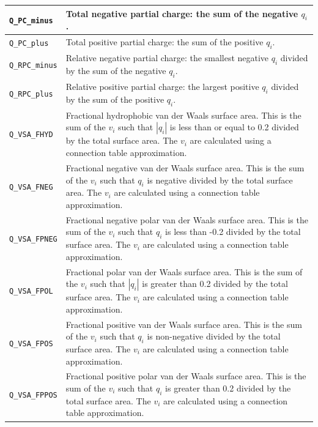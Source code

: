\documentclass[12pt,a4paper]{article}
\begin{document}
\begin{longtable}{@{\zz}|p{}|p{}|}
\texttt{Q\_PC\_minus} & Total negative partial charge: the sum of the 
negative $q_i$.\\ \hline

\texttt{Q\_PC\_plus} & Total positive partial charge: the sum of the 
positive $q_i$.\\ \hline

\texttt{Q\_RPC\_minus} & Relative negative partial charge: the smallest 
negative $q_i$ divided by the sum of the negative $q_i$.\\ \hline

\texttt{Q\_RPC\_plus} & Relative positive partial charge: the largest 
positive $q_i$ divided by the sum of the positive $q_i$.\\ \hline

\texttt{Q\_VSA\_FHYD} & Fractional hydrophobic van der Waals surface 
area. This is the sum of the $v_i$ such that $|q_i|$ is less than or 
equal to 0.2 divided by the total surface area. The $v_i$ are 
calculated using a connection table approximation.\\ \hline

\texttt{Q\_VSA\_FNEG} & Fractional negative van der Waals surface 
area. This is the sum of the $v_i$ such that $q_i$ is negative 
divided by the total surface area. The $v_i$ are calculated using 
a connection table approximation.\\ \hline

\texttt{Q\_VSA\_FPNEG} & Fractional negative polar van der Waals 
surface area. This is the sum of the $v_i$ such that $q_i$ is 
less than -0.2 divided by the total surface area. The $v_i$ are 
calculated using a connection table approximation.\\ \hline

\texttt{Q\_VSA\_FPOL} & Fractional polar van der Waals surface 
area. This is the sum of the $v_i$ such that $|q_i|$ is greater 
than 0.2 divided by the total surface area. The $v_i$ are 
calculated using a connection table approximation.\\ \hline

\texttt{Q\_VSA\_FPOS} & Fractional positive van der Waals surface 
area. This is the sum of the $v_i$ such that $q_i$ is non-negative 
divided by the total surface area. The $v_i$ are calculated using 
a connection table approximation.\\ \hline

\texttt{Q\_VSA\_FPPOS} & Fractional positive polar van der Waals 
surface area. This is the sum of the $v_i$ such that $q_i$ is 
greater than 0.2 divided by the total surface area. The $v_i$ 
are calculated using a connection table approximation.\\ \hline


\end{longtable}
\end{document}
